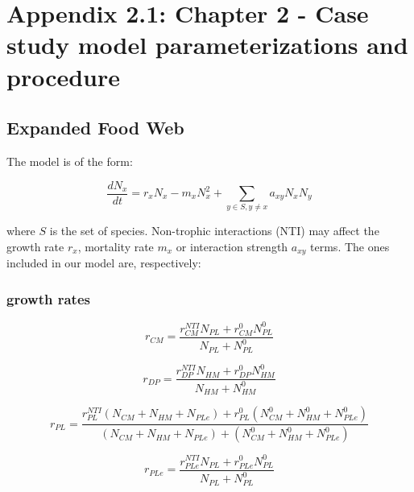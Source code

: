 \chapter[Appendix 2.1: Chapter 2 - Model parameterizations]{Appendix 2.1: Chapter 2 - Case study model parameterizations and procedure}\label{ch:Appendix2.1}

\renewcommand{\thefigure}{A.2.1.\arabic{figure}}
\setcounter{figure}{0}

\renewcommand{\thetable}{A.2.1.\arabic{table}}
\setcounter{table}{0}

\section*{Expanded Food Web}

The model is of the form:

\begin{equation}
\frac{dN_x}{dt} = r_x N_x - m_x N_x^2 + \sum_{y \in S, y \neq x} a_{xy} N_x N_y
\end{equation}

where $S$ is the set of species. Non-trophic interactions (NTI) may affect the growth rate $r_x$, mortality rate $m_x$ or interaction strength $a_{xy}$ terms. The ones included in our model are, respectively:

\subsection*{growth rates}

\begin{equation}
r_{CM} = \frac{r_{CM}^{NTI}N_{PL} + r_{CM}^{0}N_{PL}^{0}}{N_{PL} + N_{PL}^0}
\end{equation}

\begin{equation}
r_{DP} = \frac{r_{DP}^{NTI}N_{HM} + r_{DP}^{0}N_{HM}^{0}}{N_{HM} + N_{HM}^0}
\end{equation}

\begin{equation}
r_{PL} = \frac{r_{PL}^{NTI}(N_{CM}+N_{HM}+N_{PLe}) + r_{PL}^{0}(N_{CM}^{0}+N_{HM}^{0}+N_{PLe}^{0})}{(N_{CM}+N_{HM}+N_{PLe})+(N_{CM}^{0}+N_{HM}^{0}+N_{PLe}^{0})}
\end{equation}

\begin{equation}
r_{PLe} = \frac{r_{PLe}^{NTI}N_{PL} + r_{PLe}^{0}N_{PL}^{0}}{N_{PL} + N_{PL}^0}
\end{equation}

